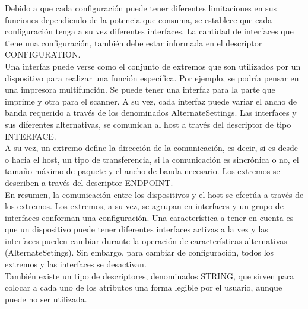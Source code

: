 Debido a que cada configuración puede tener diferentes limitaciones en sus funciones dependiendo de la potencia que consuma, se establece que cada configuración tenga a su vez diferentes interfaces. La cantidad de interfaces que tiene una configuración, también debe estar informada en el descriptor CONFIGURATION.\\

Una interfaz puede verse como el conjunto de extremos que son utilizados por un dispositivo para realizar una función específica. Por ejemplo, se podría pensar en una impresora multifunción. Se puede tener una interfaz para la parte que imprime y otra para el scanner. A su vez, cada interfaz puede variar el ancho de banda requerido a través de los denominados AlternateSettings. Las interfaces y sus diferentes alternativas, se comunican al host a través del descriptor de tipo INTERFACE.\\

A su vez, un extremo define la dirección de la comunicación, es decir, si es desde o hacia el host, un tipo de transferencia, si la comunicación es sincrónica o no, el tamaño máximo de paquete y el ancho de banda necesario. Los extremos se describen a través del descriptor ENDPOINT.\\

En resumen, la comunicación entre los dispositivos y el host se efectúa a través de los extremos. Los extremos, a su vez, se agrupan en interfaces y un grupo de interfaces conforman una configuración. Una característica a tener en cuenta es que un dispositivo puede tener diferentes interfaces activas a la vez y las interfaces pueden cambiar durante la operación de características alternativas (AlternateSetings). Sin embargo, para cambiar de configuración, todos los extremos y las interfaces se desactivan.\\

También existe un tipo de descriptores, denominados STRING, que sirven para colocar a cada uno de los atributos una forma legible por el usuario, aunque puede no ser utilizada.\\ 

